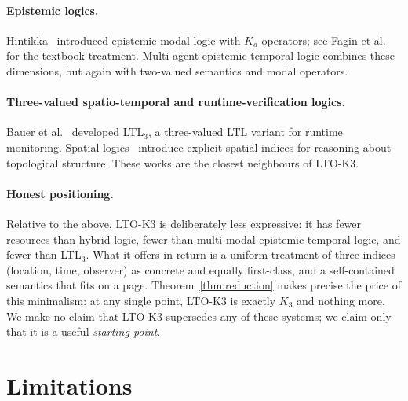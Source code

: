 \documentclass[11pt,a4paper]{article}
\theoremstyle{definition}
\theoremstyle{plain}
\theoremstyle{remark}
\begin{document}
\paragraph{Epistemic logics.} Hintikka~\cite{hintikka1962} introduced
epistemic modal logic with $K_a$ operators; see Fagin et
al.~\cite{fagin1995} for the textbook treatment. Multi-agent epistemic
temporal logic combines these dimensions, but again with two-valued
semantics and modal operators.

\paragraph{Three-valued spatio-temporal and runtime-verification logics.}
Bauer et al.~\cite{bauer2011rv} developed LTL$_3$, a three-valued LTL
variant for runtime monitoring. Spatial logics~\cite{aiello2007handbook}
introduce explicit spatial indices for reasoning about topological
structure. These works are the closest neighbours of LTO-K3.

\paragraph{Honest positioning.} Relative to the above, LTO-K3 is
deliberately less expressive: it has fewer resources than hybrid logic,
fewer than multi-modal epistemic temporal logic, and fewer than
LTL$_3$. What it offers in return is a uniform treatment of three indices
(location, time, observer) as concrete and equally first-class, and a
self-contained semantics that fits on a page. Theorem~\ref{thm:reduction}
makes precise the price of this minimalism: at any single point, LTO-K3
is exactly $K_3$ and nothing more. We make no claim that LTO-K3
supersedes any of these systems; we claim only that it is a useful
\emph{starting point}.

\section{Limitations}
\label{sec:limitations}
\end{document}
